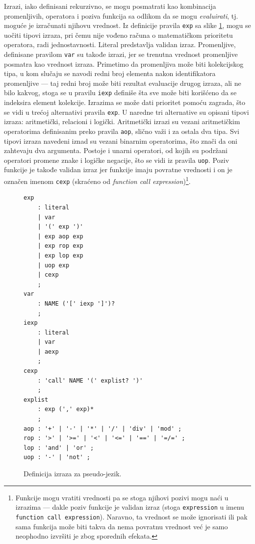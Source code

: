 Izrazi, iako definisani rekurzivno, se mogu posmatrati kao kombinacija promenljivih, operatora i poziva funkcija sa odlikom da se mogu \emph{evaluirati}, tj. moguće je izračunati njihovu vrednost. Iz definicije pravila \texttt{exp} sa slike \ref{fig:PseudoDef6}, mogu se uočiti tipovi izraza, pri čemu nije vođeno računa o matematičkom prioritetu operatora, radi jednostavnosti. Literal predstavlja validan izraz. Promenljive, definisane pravilom \texttt{var} su takođe izrazi, jer se trenutna vrednost promenljive posmatra kao vrednost izraza. Primetimo da promenljiva može biti kolekcijskog tipa, u kom slučaju se navodi redni broj elementa nakon identifikatora promenljive --- taj redni broj može biti rezultat evaluacije drugog izraza, ali ne bilo kakvog, stoga se u pravilu \texttt{iexp} definiše šta sve može biti korišćeno da se indeksira element kolekcije. Izrazima se može dati prioritet pomoću zagrada, što se vidi u trećoj alternativi pravila \texttt{exp}. U naredne tri alternative su opisani tipovi izraza: aritmetički, relacioni i logički. Aritmetički izrazi su vezani aritmetičkim operatorima definisanim preko pravila \texttt{aop}, slično važi i za ostala dva tipa. Svi tipovi izraza navedeni iznad su vezani binarnim operatorima, što znači da oni zahtevaju dva argumenta. Postoje i unarni operatori, od kojih su podržani operatori promene znake i logičke negacije, što se vidi iz pravila \texttt{uop}. Poziv funkcije je takođe validan izraz jer funkcije imaju povratne vrednosti i on je označen imenom \texttt{cexp} (skraćeno od \emph{function call expression})\footnote{Funkcije mogu vratiti vrednosti pa se stoga njihovi pozivi mogu naći u izrazima --- dakle poziv funkcije je validan izraz (stoga \texttt{expression} u imenu \texttt{function call expression}). Naravno, ta vrednost se može ignorisati ili pak sama funkcija može biti takva da nema povratnu vrednost već je samo neophodno izvršiti je zbog sporednih efekata.}.

\begin{figure}[h!]
\begin{lstlisting}[language={}]
exp
    : literal 
    | var
    | '(' exp ')'
    | exp aop exp
    | exp rop exp
    | exp lop exp
    | uop exp
    | cexp
    ;
var 
    : NAME ('[' iexp ']')?
    ;
iexp 
    : literal
    | var
    | aexp
    ;
cexp
    : 'call' NAME '(' explist? ')'
    ;
explist
    : exp (',' exp)*
    ;
aop : '+' | '-' | '*' | '/' | 'div' | 'mod' ;
rop : '>' | '>=' | '<' | '<=' | '==' | '=/=' ;
lop : 'and' | 'or' ;
uop : '-' | 'not' ;
\end{lstlisting}
\caption{Definicija izraza za pseudo-jezik.}
\label{fig:PseudoDef6}
\end{figure}

